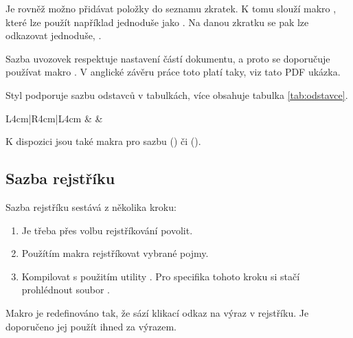 \documentclass[
  master=false,               %
  font=sans,                  %
  printversion=false,         %
  joinlists=true,             %
  glossaries=true,            %
  figures=true,               %
  tables=true,                %
  sourcecodes=true,					  %
  theorems=true,						  %
  bibencoding=utf8,           %
  language=czech,             %
  encoding=utf8,              %
  field=inf,                  %
  index=true,                 %
  biblatex=true               %
]{updiplom}
\begin{document}
Je rovněž možno přidávat položky do seznamu zkratek. K tomu slouží makro , které lze použít například jednoduše jako . Na danou zkratku se pak lze odkazovat jednoduše, .

Sazba uvozovek respektuje nastavení částí dokumentu, a proto se doporučuje používat makro . V anglické závěru práce toto platí taky, viz tato PDF ukázka.

Styl podporuje sazbu odstavců v tabulkách, více obsahuje tabulka \ref{tab:odstavce}.

\begin{table}
\begin{center}
\caption{Seznam přepínačů}\label{tab:odstavce}
\begin{tabular}{L{4cm}|R{4cm}|L{4cm}}
\lipsum[23] & \lipsum[22] & \lipsum[21]
\end{tabular}
\end{center}
\end{table}

K dispozici jsou také makra pro sazbu \csharp{} () či \cpp{} ().

\subsection{Sazba rejstříku}
Sazba rejstříku sestává z několika kroku:

\begin{enumerate}
\item Je třeba přes volbu  rejstříkování povolit.
\item Použítím makra  rejstříkovat vybrané pojmy.
\item Kompilovat s použitím utility . Pro specifika tohoto kroku si stačí prohlédnout soubor .
\end{enumerate}

Makro  je redefinováno tak, že sází klikací odkaz na výraz v rejstříku. Je doporučeno jej použít ihned za výrazem.
\end{document}
